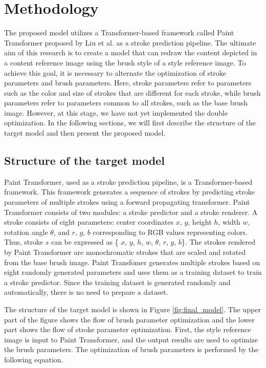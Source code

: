 \documentclass{mva_style}
\begin{document}
\section{Methodology}
The proposed model utilizes a Transformer-based framework called Paint 
Transformer proposed by Liu et al.\cite{PaintTransformer} as a stroke prediction 
pipeline. The ultimate aim of this research is to create a model that can 
redraw the content depicted in a content reference image using the brush 
style of a style reference image. To achieve this goal, it is necessary to 
alternate the optimization of stroke parameters and brush parameters.
Here, stroke parameters refer to parameters such as the color and size of 
strokes that are different for each stroke, while brush parameters refer to 
parameters common to all strokes, such as the base brush image.
However, at this stage, we have not yet implemented the double optimization.
In the following sections, we will first describe the structure of the 
target model and then present the proposed model.

\subsection{Structure of the target model}
Paint Transformer, used as a stroke prediction pipeline, is a Transformer-based 
framework. This framework generates a sequence of strokes by predicting 
stroke parameters of multiple strokes using a forward propagating transformer.
Paint Transformer consists of two modules: a stroke predictor and a stroke 
renderer. 
A stroke consists of eight parameters: center coordinates $x$, $y$, height $h$,
width $w$, rotation angle $\theta$, and $r$, $g$, $b$ corresponding to RGB values 
representing colors. Thus, stroke $s$ can be expressed as \{ $x$, $y$, $h$, $w$, $\theta$, $r$, $g$, $b$\}.
The strokes rendered by Paint Transformer are monochromatic strokes that are 
scaled and rotated from the base brush image. 
Paint Transfomer generates multiple strokes based on eight randomly generated 
parameters and uses them as a training dataset to train a stroke predictor. 
Since the training dataset is generated randomly and automatically, there is 
no need to prepare a dataset. 

The structure of the target model is shown in Figure \ref{fig:final_model}.
The upper part of the figure shows the flow of brush parameter optimization and 
the lower part shows the flow of stroke parameter optimization. First, the style 
reference image is input to Paint Transformer, and the output results are used 
to optimize the brush parameters. The optimization of brush parameters is 
performed by the following equation.
\end{document}
